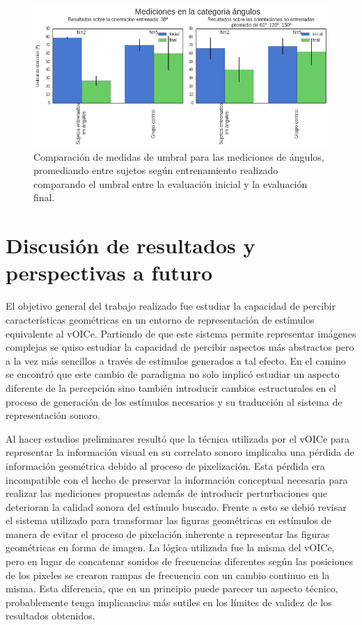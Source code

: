 \documentclass{article}
\numberwithin{figure}{section}
\begin{document}
    \begin{figure}
        \center
        \includegraphics[width=\textwidth]{Imagenes/TransferenciaAngulosBarras.png}
        \caption{Comparación de medidas de umbral para las mediciones de ángulos, promediando entre sujetos según entrenamiento realizado comparando el umbral entre la evaluación inicial y la evaluación final.}
        \label{fig:TransferenciaAngulosBarras}
    \end{figure}  
    
\section{Discusión de resultados y perspectivas a futuro}
    
    El objetivo general del trabajo realizado fue estudiar la capacidad de percibir características geométricas en un entorno de representación de estímulos equivalente al vOICe. Partiendo de que este sistema permite representar imágenes complejas se quiso estudiar la capacidad de percibir aspectos más abstractos pero a la vez más sencillos a través de estímulos generados a tal efecto. En el camino se encontró que este cambio de paradigma no solo implicó estudiar un aspecto diferente de la percepción sino también introducir cambios estructurales en el proceso de generación de los estímulos necesarios y su traducción al sistema de representación sonoro. 
    
    Al hacer estudios preliminares resultó que la técnica utilizada por el vOICe para representar la información visual en su correlato sonoro implicaba una pérdida de información geométrica debido al proceso de pixelización. Esta pérdida era incompatible con el hecho de preservar la información conceptual necesaria para realizar las mediciones propuestas además de introducir perturbaciones que deterioran la calidad sonora del estímulo buscado. Frente a esto se debió revisar el sistema utilizado para transformar las figuras geométricas en estímulos de manera de evitar el proceso de pixelación inherente a representar las figuras geométricas en forma de imagen. La lógica utilizada fue la misma del vOICe, pero en lugar de concatenar sonidos de frecuencias diferentes según las posiciones de los pixeles se crearon rampas de frecuencia con un cambio continuo en la misma. Esta diferencia, que en un principio puede parecer un aspecto técnico, probablemente tenga implicancias más sutiles en los límites de validez de los resultados obtenidos. 
    
\end{document}
